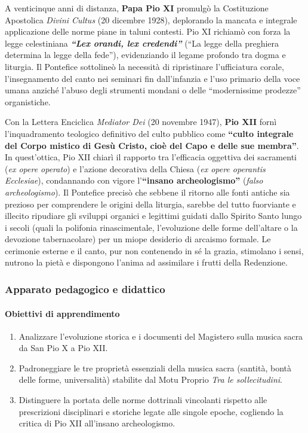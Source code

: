 \documentclass[12pt,a4paper]{article}
\begin{document}
	A venticinque anni di distanza, \textbf{Papa Pio XI} promulgò la Costituzione Apostolica \emph{Divini Cultus} (20 dicembre 1928), deplorando la mancata e integrale applicazione delle norme piane in taluni contesti. Pio XI richiamò con forza la legge celestiniana \textbf{\emph{``Lex orandi, lex credendi''}} (``La legge della preghiera determina la legge della fede''), evidenziando il legame profondo tra dogma e liturgia. Il Pontefice sottolineò la necessità di ripristinare l'ufficiatura corale, l'insegnamento del canto nei seminari fin dall'infanzia e l'uso primario della voce umana anziché l'abuso degli strumenti mondani o delle ``modernissime prodezze'' organistiche.
	
	Con la Lettera Enciclica \emph{Mediator Dei} (20 novembre 1947), \textbf{Pio XII} fornì l'inquadramento teologico definitivo del culto pubblico come \textbf{``culto integrale del Corpo mistico di Gesù Cristo, cioè del Capo e delle sue membra''}. In quest'ottica, Pio XII chiarì il rapporto tra l'efficacia oggettiva dei sacramenti (\emph{ex opere operato}) e l'azione decorativa della Chiesa (\emph{ex opere operantis Ecclesiae}), condannando con vigore l'\textbf{``insano archeologismo''} (\emph{falso archeologismo}). Il Pontefice precisò che sebbene il ritorno alle fonti antiche sia prezioso per comprendere le origini della liturgia, sarebbe del tutto fuorviante e illecito ripudiare gli sviluppi organici e legittimi guidati dallo Spirito Santo lungo i secoli (quali la polifonia rinascimentale, l'evoluzione delle forme dell'altare o la devozione tabernacolare) per un miope desiderio di arcaismo formale. Le cerimonie esterne e il canto, pur non contenendo in sé la grazia, stimolano i sensi, nutrono la pietà e dispongono l'anima ad assimilare i frutti della Redenzione.
	
	\subsubsection{Apparato pedagogico e didattico}\label{apparato-pedagogico-e-didattico-1}
	
	\paragraph{Obiettivi di apprendimento}\label{obiettivi-di-apprendimento-1}
	
	\begin{enumerate}[label=\arabic*.,leftmargin=*]
		\item Analizzare l'evoluzione storica e i documenti del Magistero sulla musica sacra da San Pio X a Pio XII.
		\item Padroneggiare le tre proprietà essenziali della musica sacra (santità, bontà delle forme, universalità) stabilite dal Motu Proprio \emph{Tra le sollecitudini}.
		\item Distinguere la portata delle norme dottrinali vincolanti rispetto alle prescrizioni disciplinari e storiche legate alle singole epoche, cogliendo la critica di Pio XII all'insano archeologismo.
	\end{enumerate}
	
\end{document}
